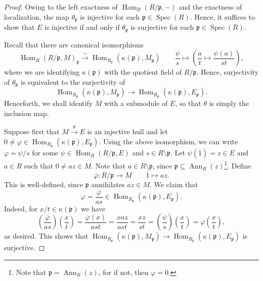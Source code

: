 \documentclass[10pt]{article}
\theoremstyle{thmstyle}
\theoremstyle{defstyle}
\newcommand{\Spec}{\operatorname{Spec}}
\newcommand{\Ann}{\operatorname{Ann}}
\newcommand{\Hom}{\operatorname{Hom}}
\newcommand{\frakp}{\mathfrak{p}} %
\begin{document}
\begin{proof}
    Owing to the left exactness of $\Hom_R(R/\frakp, -)$ and the exactness of localization, the map $\theta_\frakp$ is injective for each $\frakp\in\Spec(R)$. Hence, it suffices to show that $E$ is injective if and only if $\theta_\frakp$ is surjective for each $\frakp\in\Spec (R)$. 

    Recall that there are canonical isomorphisms 
    \begin{equation*}
        \Hom_R(R/\frakp, M)_\frakp\xrightarrow{\sim}\Hom_{R_\frakp}(\kappa(\frakp), M_\frakp)\qquad\frac{\psi}{s}\longmapsto\left(\frac{a}{t}\mapsto \frac{\psi(a)}{st}\right),
    \end{equation*}
    where we are identifying $\kappa(\frakp)$ with the quotient field of $R/\frakp$. Hence, surjectivity of $\theta_\frakp$ is equivalent to the surjectivity of 
    \begin{equation*}
        \Hom_{R_\frakp}(\kappa(\frakp), M_\frakp)\to\Hom_{R_\frakp}(\kappa(\frakp), E_\frakp).
    \end{equation*}
    Henceforth, we shall identify $M$ with a submodule of $E$, so that $\theta$ is simply the inclusion map.

    Suppose first that $M\xrightarrow{\theta} E$ is an injective hull and let $0\ne\varphi\in\Hom_{R_\frakp}(\kappa(\frakp), E_\frakp)$. Using the above isomorphism, we can write $\varphi = \psi/s$ for some $\psi\in\Hom_R(R/\frakp, E)$ and $s\in R\setminus\frakp$. Let $\psi(\overline 1) = z\in E$ and $a\in R$ such that $0\ne az\in M$. Note that $a\in R\setminus\frakp$, since $\frakp\subseteq\Ann_R(z)$\footnote{Note that $\frakp = \Ann_R(z)$, for if not, then $\varphi = 0$.}. Define
    \begin{equation*}
        \overline\varphi: R/\frakp\longrightarrow M\qquad \overline 1\longmapsto az.
    \end{equation*}
    This is well-defined, since $\frakp$ annihilates $az\in M$. We claim that 
    \begin{equation*}
        \varphi = \frac{\overline\varphi}{as}\in\Hom_{R_\frakp}\left(\kappa(\frakp), E_\frakp\right).
    \end{equation*}
    Indeed, for $x/t\in\kappa(\frakp)$ we have 
    \begin{equation*}
        \left(\frac{\overline\varphi}{as}\right)\left(\frac{x}{t}\right) = \frac{\overline\varphi(x)}{ast} = \frac{xaz}{ast} = \frac{xz}{st} = \left(\frac{\psi}{s}\right)\left(\frac{x}{t}\right) = \varphi\left(\frac{x}{t}\right),
    \end{equation*}
    as desired. This shows that $\Hom_{R_\frakp}(\kappa(\frakp), M_\frakp)\to\Hom_{R_\frakp}(\kappa(\frakp), E_\frakp)$ is surjective. 


\end{proof}
\end{document}
